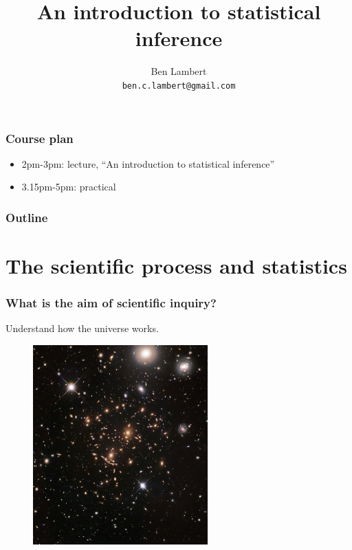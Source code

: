 \documentclass[handout]{beamer}
\title{An introduction to statistical inference}
\author[Ben Lambert]{Ben Lambert\inst{1}\\ \texttt{ben.c.lambert@gmail.com}}
\date{\displaydate{date}}
\institute[University of Oxford]{
\inst{1}University of Oxford}
\begin{document}
\begin{frame}
\titlepage
\end{frame}

\begin{frame}
	\frametitle{Course plan}
	\begin{itemize}
		\item 2pm-3pm: lecture, ``An introduction to statistical inference''
		\item 3.15pm-5pm: practical
	\end{itemize}
	
\end{frame}

\begin{frame}
	\frametitle{Outline}
	\tableofcontents
\end{frame}

\section{The scientific process and statistics}
\frame{\tableofcontents[currentsection]}

\begin{frame}
	\frametitle{What is the aim of scientific inquiry?}
	Understand how the universe works.
	
		\begin{figure}[ht]
			\centerline{\includegraphics[width=0.6\textwidth]{../figures/universe.jpeg}}
		\end{figure}
	
\end{frame}
\end{document}
